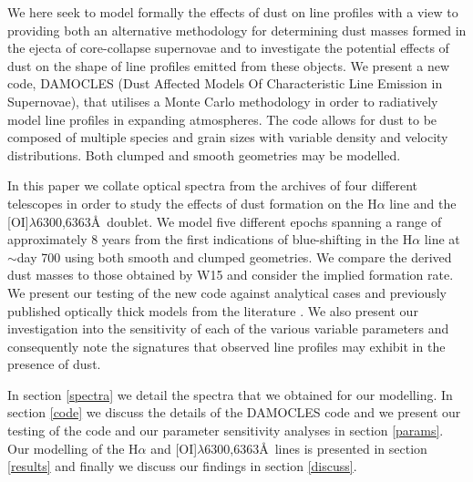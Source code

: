 \documentclass[useAMS,usenatbib,usegraphicx]{mnras}
\begin{document}
We here seek to model formally the effects of dust on line profiles with a view to providing both an alternative methodology for determining dust masses formed in the ejecta of core-collapse supernovae and to investigate the potential effects of dust on the shape of line profiles emitted from these objects.  We present a new code, DAMOCLES (Dust Affected Models Of Characteristic Line Emission in Supernovae), that utilises a Monte Carlo methodology in order to radiatively model line profiles in expanding atmospheres.  The code allows for dust to be composed of multiple species and grain sizes with variable density and velocity distributions.  Both clumped and smooth geometries may be modelled.  

In this paper we collate optical spectra from the archives of four different telescopes in order to study the effects of dust formation on the H$\alpha$ line and the [OI]$\lambda$6300,6363\AA\ doublet.  We model five different epochs spanning a range of approximately 8 years from the first indications of blue-shifting in the H$\alpha$ line at $\sim$day 700 using both smooth and clumped geometries.  We compare the derived dust masses to those obtained by W15 and consider the implied formation rate.  We present our testing of the new code against analytical cases and previously published optically thick models from the literature \citep{Lucy1989a}. We also present our investigation into the sensitivity of each of the various variable parameters and consequently note the signatures that observed line profiles may exhibit in the presence of dust.

In section \ref{spectra} we detail the spectra that we obtained for our modelling.  In section \ref{code} we discuss the details of the DAMOCLES code and  we present our testing of the code and our parameter sensitivity analyses in section \ref{params}.  Our modelling of the H$\alpha$ and [OI]$\lambda$6300,6363\AA\ lines is presented in section \ref{results} and finally we discuss our findings in section \ref{discuss}.


\end{document}
